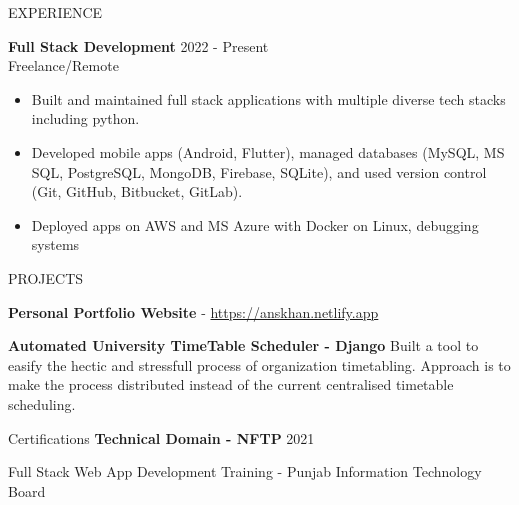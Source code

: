 \documentclass{resume} %
\begin{document}
\begin{rSection}{EXPERIENCE}

\textbf{Full Stack Development} \hfill 2022 - Present\\
Freelance/Remote %
 \begin{itemize}
    \itemsep -3pt {} 
     \item Built and maintained full stack applications with multiple diverse tech stacks including python.
     \item Developed mobile apps (Android, Flutter), managed databases (MySQL, MS SQL, PostgreSQL, MongoDB, Firebase, SQLite), and used version control (Git, GitHub, Bitbucket, GitLab).
     \item Deployed apps on AWS and MS Azure with Docker on Linux, debugging systems 
 \end{itemize}



\end{rSection} 


\begin{rSection}{PROJECTS}
\vspace{-1.25em}
\item \textbf{Personal Portfolio Website}  - \href{https://anskhan.netlify.app}{https://anskhan.netlify.app}
\item \textbf{Automated University TimeTable Scheduler - Django} {Built a tool to easify the hectic and stressfull process of organization timetabling. Approach is to make the process distributed instead of the current centralised timetable scheduling.}

\end{rSection} 

\begin{rSection}{Certifications} 
	\textbf{Technical Domain - NFTP} \hfill 2021 
    \item {Full Stack Web App Development Training - Punjab Information Technology
    Board}



\end{rSection}

\end{document}
